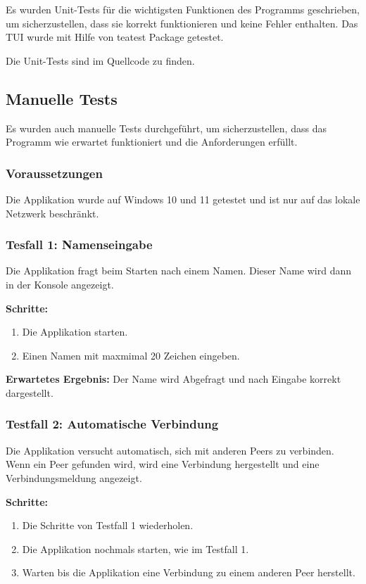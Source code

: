 Es wurden Unit-Tests für die wichtigsten Funktionen des Programms geschrieben, um sicherzustellen, dass sie korrekt funktionieren und keine Fehler enthalten.
Das TUI wurde mit Hilfe von teatest Package getestet. \cite{teatest_docs}

Die Unit-Tests sind im Quellcode zu finden.


\subsection{Manuelle Tests}

Es wurden auch manuelle Tests durchgeführt, um sicherzustellen, dass das Programm wie erwartet funktioniert und die Anforderungen erfüllt.

\subsubsection{Voraussetzungen}

Die Applikation wurde auf Windows 10 und 11 getestet und ist nur auf das lokale Netzwerk beschränkt.


\subsubsection{Tesfall 1: Namenseingabe}
Die Applikation fragt beim Starten nach einem Namen. Dieser Name wird dann in der Konsole angezeigt.

\noindent\textbf{Schritte:}
\begin{enumerate}
    \item Die Applikation starten.
    \item Einen Namen mit maxmimal 20 Zeichen eingeben.
\end{enumerate}

\noindent\textbf{Erwartetes Ergebnis:} Der Name wird Abgefragt und nach Eingabe korrekt dargestellt.

\subsubsection{Testfall 2: Automatische Verbindung}
Die Applikation versucht automatisch, sich mit anderen Peers zu verbinden. Wenn ein Peer gefunden wird, wird eine Verbindung hergestellt und eine Verbindungsmeldung angezeigt.

\noindent\textbf{Schritte:}
\begin{enumerate}
    \item Die Schritte von Testfall 1 wiederholen.
    \item Die Applikation nochmals starten, wie im Testfall 1.
    \item Warten bis die Applikation eine Verbindung zu einem anderen Peer herstellt.
\end{enumerate}

